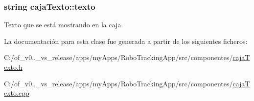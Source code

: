 \hypertarget{classcaja_texto_a5b62049df6eb5efb5831b57b4958d115}{}
\subsubsection[{texto}]{\setlength{\rightskip}{0pt plus 5cm}string caja\+Texto\+::texto\hspace{0.3cm}{\ttfamily [private]}}\label{classcaja_texto_a5b62049df6eb5efb5831b57b4958d115}


Texto que se está mostrando en la caja. 



La documentación para esta clase fue generada a partir de los siguientes ficheros\+:\begin{DoxyCompactItemize}
\item 
C\+:/of\+\_\+v0..\+\_\+vs\+\_\+release/apps/my\+Apps/\+Robo\+Tracking\+App/src/componentes/\hyperlink{caja_texto_8h}{caja\+Texto.\+h}\item 
C\+:/of\+\_\+v0..\+\_\+vs\+\_\+release/apps/my\+Apps/\+Robo\+Tracking\+App/src/componentes/\hyperlink{caja_texto_8cpp}{caja\+Texto.\+cpp}\end{DoxyCompactItemize}
